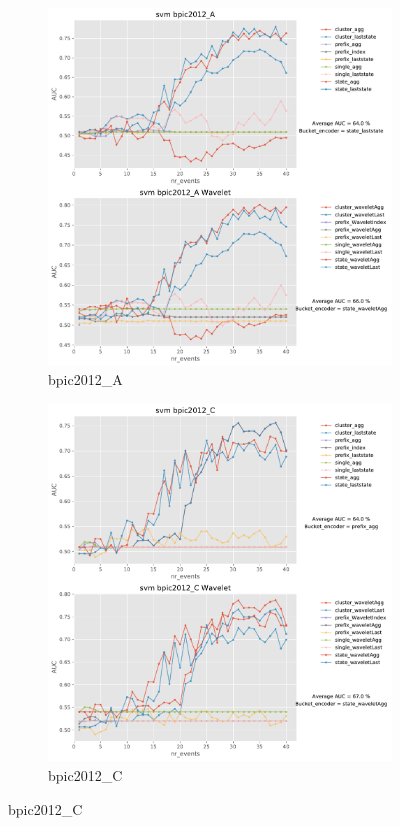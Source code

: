 \documentclass[twoside,11pt]{Latex/Classes/PhDthesisPSnPDF}
\begin{document}
\begin{figure}[!htbp] %

	\begin{subfigure}{0.48\textwidth}
		\includegraphics[width=\linewidth]{images/wavelet/graphs2svm/bpic2012_A.pdf}
		\caption{bpic2012\_A} 
	\end{subfigure}\hspace*{\fill}
	\begin{subfigure}{0.48\textwidth}
		\includegraphics[width=\linewidth]{images/wavelet/graphs2svm/bpic2012_C.pdf}
		\caption{bpic2012\_C}
	\end{subfigure}
	

\end{figure}
\end{document}
